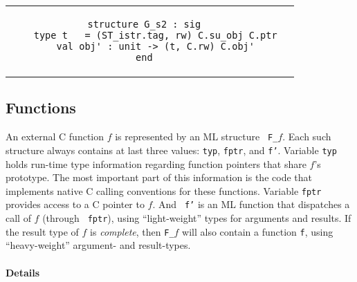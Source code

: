 \documentclass[titlepage,letterpaper]{article}
\begin{document}
\begin{small}
\begin{center}
\begin{tabular}{c|c}
\begin{minipage}{4in}
\begin{verbatim}
structure G_s2 : sig
    type t   = (ST_istr.tag, rw) C.su_obj C.ptr
    val obj' : unit -> (t, C.rw) C.obj'
end

\end{verbatim}
\end{minipage}
\end{tabular}
\end{center}
\end{small}

\subsection{Functions}

An external C function $f$ is represented by an ML structure {\tt
  F\_}$f$.  Each such structure always contains at last three values:
{\tt typ}, {\tt fptr}, and {\tt f'}.  Variable {\tt typ} holds
run-time type information regarding function pointers that share $f$'s
prototype.  The most important part of this information is the code
that implements native C calling conventions for these functions.
Variable {\tt fptr} provides access to a C pointer to $f$.  And {\tt
  f'} is an ML function that dispatches a call of $f$ (through {\tt
  fptr}), using ``light-weight'' types for arguments and results.  If
the result type of $f$ is {\em complete}, then {\tt F\_}$f$ will also
contain a function {\tt f}, using ``heavy-weight'' argument- and
result-types.

\paragraph*{Details}
\end{document}
